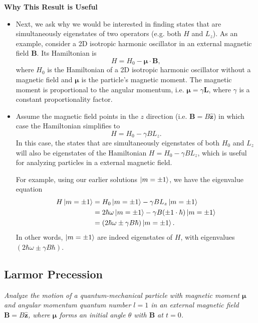 \documentclass[11pt, a4paper]{article}
\renewcommand{\vec}[1]{\bm{#1}} %
\newcommand{\uvec}[1]{\hat{\vec{#1}}} %
\begin{document}
\textbf{Why This Result is Useful}\\
\begin{itemize}
	\item Next, we ask why we would be interested in finding states that are simultaneously eigenstates of two operators (e.g. both $ H $ and $ L_{z} $). As an example, consider a 2D isotropic harmonic oscillator in an external magnetic field $ \vec{B} $. Its Hamiltonian is
	\begin{equation*}
		H = H_{0} - \vec{\mu} \cdot \vec{B},
	\end{equation*}
	where $ H_{0} $ is the Hamiltonian of a 2D isotropic harmonic oscillator without a magnetic field and $ \vec{\mu} $ is the particle's magnetic moment. The magnetic moment is proportional to the angular momentum, i.e. $ \vec{\mu} = \gamma \vec{L} $, where $ \gamma $ is a constant proportionality factor.
	
	\item Assume the magnetic field points in the $ z $ direction (i.e. $ \vec{B} = B \uvec{z} $) in which case the Hamiltonian simplifies to
	\begin{equation*}
		H = H_{0} - \gamma B L_{z}.
	\end{equation*}
	In this case, the states that are simultaneously eigenstates of both $ H_{0} $ and $ L_{z} $ will also be eigenstates of the Hamiltonian $ H = H_{0} - \gamma B L_{z}$, which is useful for analyzing particles in  a external magnetic field. 
	
	For example, using our earlier solutions $ \ket{m = \pm 1} $, we have the eigenvalue equation
	\begin{align*}
		H \ket{m = \pm 1} &= H_{0}\ket{m = \pm 1} - \gamma B L_{z} \ket{m = \pm 1} \\
		& = 2\hbar \omega \ket{m = \pm 1} - \gamma B (\pm 1 \cdot \hbar)\ket{m = \pm 1} \\
		&= (2\hbar \omega \pm \gamma B\hbar)\ket{m = \pm 1}.
	\end{align*}
	In other words, $ \ket{m = \pm 1} $ are indeed eigenstates of $ H $, with eigenvalues $ (2\hbar \omega \pm \gamma B\hbar) $.
\end{itemize}


\subsection{Larmor Precession}
\textit{Analyze the motion of a quantum-mechanical particle with magnetic moment $ \vec{\mu} $ and angular momentum quantum number $ l = 1 $ in an external magnetic field $ \vec{B} = B\uvec{z} $, where $ \vec{\mu} $ forms an initial angle $ \theta $ with $ \vec{B} $ at $ t = 0 $.}
\end{document}
